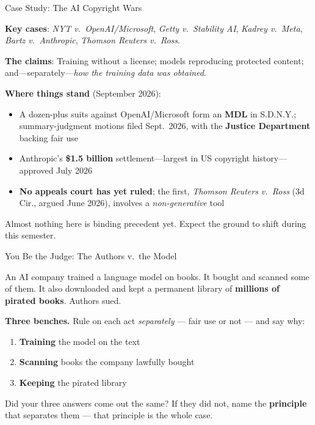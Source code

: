 ﻿\documentclass[aspectratio=169,11pt]{beamer}
\begin{document}
\begin{frame}{Case Study: The AI Copyright Wars}
\begin{casestudybox}
\textbf{Key cases}: \textit{NYT v.\ OpenAI/Microsoft}, \textit{Getty v.\ Stability AI}, \textit{Kadrey v.\ Meta}, \textit{Bartz v.\ Anthropic}, \textit{Thomson Reuters v.\ Ross}.
\end{casestudybox}

\vspace{0.15cm}
\textbf{The claims}: Training without a license; models reproducing protected content; and---separately---\emph{how the training data was obtained}.

\vspace{0.15cm}
\textbf{Where things stand} (September 2026):
\begin{itemize}
    \item A dozen-plus suits against OpenAI/Microsoft form an \textbf{MDL} in S.D.N.Y.; summary-judgment motions filed Sept.\ 2026, with the \textbf{Justice Department} backing fair use
    \item Anthropic's \textbf{\$1.5 billion} settlement---largest in US copyright history---approved July 2026
    \item \textbf{No appeals court has yet ruled}; the first, \textit{Thomson Reuters v.\ Ross} (3d Cir., argued June 2026), involves a \emph{non-generative} tool
\end{itemize}

\vspace{0.1em}
{\scriptsize Almost nothing here is binding precedent yet. Expect the ground to shift during this semester.}
\end{frame}
\begin{frame}[shrink=8]{You Be the Judge: The Authors v.\ the Model}
\begin{casestudybox}
\small
An AI company trained a language model on books. It bought and scanned some of them. It also downloaded and kept a permanent library of \textbf{millions of pirated books}. Authors sued.
\end{casestudybox}

\textbf{Three benches.} Rule on each act \emph{separately} --- fair use or not --- and say why:
\begin{enumerate}
    \item \textbf{Training} the model on the text
    \item \textbf{Scanning} books the company lawfully bought
    \item \textbf{Keeping} the pirated library
\end{enumerate}

\begin{discussionbox}
Did your three answers come out the same? If they did not, name the \textbf{principle} that separates them --- that principle is the whole case.
\end{discussionbox}
\end{frame}
\end{document}
